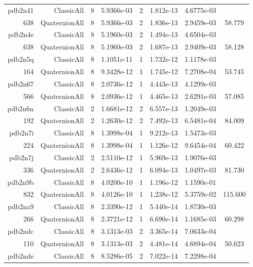\begin{xltabular}{\textwidth}{r|rcS[table-format=1.4e+2]cS[table-format=1.3e+2]S[table-format=1.4e+2]S[table-format=-1.3]}
pdb2n41 & ClassicAll & 8 & 5.9366e-03 & 2 & 1.812e-13 & 4.6775e-03 & \\
638 & QuaternionAll & 8 & 5.9366e-03 & 2 & 1.836e-13 & 2.9459e-03 & 58.779\\  \addlinespace
pdb2n4e & ClassicAll & 8 & 5.1960e-03 & 2 & 1.494e-13 & 4.6504e-03 & \\
638 & QuaternionAll & 8 & 5.1960e-03 & 2 & 1.687e-13 & 2.9409e-03 & 58.128\\  \addlinespace
pdb2n5q & ClassicAll & 8 & 1.1051e-11 & 1 & 1.732e-12 & 1.1178e-03 & \\
164 & QuaternionAll & 8 & 9.3428e-12 & 1 & 1.745e-12 & 7.2708e-04 & 53.745\\  \addlinespace
pdb2n67 & ClassicAll & 8 & 2.0736e-12 & 1 & 4.443e-13 & 4.1299e-03 & \\
566 & QuaternionAll & 8 & 2.0936e-12 & 1 & 4.465e-13 & 2.6291e-03 & 57.085\\  \addlinespace
pdb2n6n & ClassicAll & 2 & 1.6681e-12 & 2 & 6.557e-13 & 1.2049e-03 & \\
192 & QuaternionAll & 2 & 1.2630e-12 & 2 & 7.492e-13 & 6.5481e-04 & 84.009\\  \addlinespace
pdb2n7i & ClassicAll & 8 & 1.3998e-04 & 1 & 9.212e-13 & 1.5473e-03 & \\
224 & QuaternionAll & 8 & 1.3998e-04 & 1 & 1.126e-12 & 9.6454e-04 & 60.422\\  \addlinespace
pdb2n7j & ClassicAll & 2 & 2.5110e-12 & 1 & 5.969e-13 & 1.9076e-03 & \\
336 & QuaternionAll & 2 & 2.6436e-12 & 1 & 6.094e-13 & 1.0497e-03 & 81.730\\  \addlinespace
pdb2n9b & ClassicAll & 8 & 4.0200e-10 & 1 & 1.196e-12 & 1.1590e-01 & \\
832 & QuaternionAll & 8 & 4.0126e-10 & 1 & 1.238e-12 & 5.3759e-02 & 115.600\\  \addlinespace
pdb2na9 & ClassicAll & 8 & 2.3390e-12 & 1 & 5.440e-14 & 1.8730e-03 & \\
266 & QuaternionAll & 8 & 2.3721e-12 & 1 & 6.690e-14 & 1.1685e-03 & 60.298\\  \addlinespace
pdb2ndc & ClassicAll & 8 & 3.1313e-03 & 2 & 3.365e-14 & 7.0633e-04 & \\
110 & QuaternionAll & 8 & 3.1313e-03 & 2 & 4.481e-14 & 4.6894e-04 & 50.623\\  \addlinespace
pdb2nde & ClassicAll & 8 & 8.5286e-05 & 2 & 7.022e-14 & 7.2298e-04 & \\

\end{xltabular}

